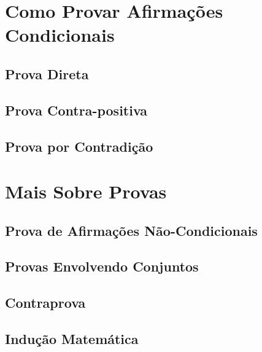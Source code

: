 \documentclass[a4paper,11pt]{book}
\theoremstyle{definition}
\theoremstyle{break}
\begin{document}
\part{Como Provar Afirmações Condicionais}

\chapter{Prova Direta}

\chapter{Prova Contra-positiva}

\chapter{Prova por Contradição}


\part{Mais Sobre Provas}

\chapter{Prova de Afirmações Não-Condicionais}

\chapter{Provas Envolvendo Conjuntos}

\chapter{Contraprova}

\chapter{Indução Matemática}
\end{document}
